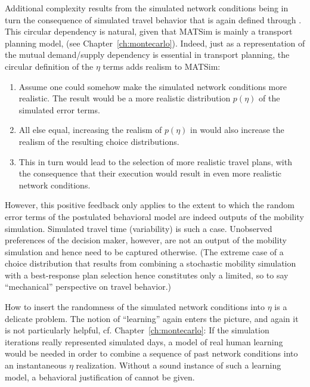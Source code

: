 Additional complexity results from the simulated network conditions
being in turn the consequence of simulated travel behavior that is
again defined through . This circular
dependency is natural, given that MATSim is mainly a transport planning
model, (see Chapter~\ref{ch:montecarlo}). Indeed, just as a representation
of the mutual demand/supply dependency is essential in transport planning,
the circular definition of the $\eta$ terms adds realism to MATSim:
\begin{enumerate}
\item Assume one could somehow make the simulated network conditions more
realistic. The result would be a more realistic distribution $p(\eta)$
of the simulated error terms.
\item All else equal, increasing the realism of $p(\eta)$ in 
would also increase the realism of the resulting choice distributions.
\item This in turn would lead to the selection of more realistic travel
plans, with the consequence that their execution would result in even
more realistic network conditions.
\end{enumerate}
However, this positive feedback only applies to the extent to which
the random error terms of the postulated behavioral model are indeed
outputs of the mobility simulation. Simulated travel time (variability)
is such a case. Unobserved preferences of the decision maker, however,
are not an output of the mobility simulation and hence need to be
captured otherwise. (The extreme case of a choice distribution that
results from combining a stochastic mobility simulation with a best-response
plan selection hence constitutes only a limited, so to say {}``mechanical''
perspective on travel behavior.)

How to insert the randomness of the simulated network conditions into
$\eta$ is a delicate problem. The notion of {}``learning'' again
enters the picture, and again it is not particularly helpful, cf.
Chapter~\ref{ch:montecarlo}: If the simulation iterations really represented
simulated days, a model of real human learning would be needed in
order to combine a sequence of past network conditions into an instantaneous
$\eta$ realization. Without a sound instance of such a learning model,
a behavioral justification of  cannot
be given.

